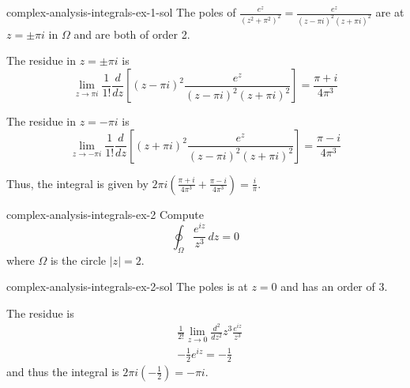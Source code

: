 \documentclass[preview]{standalone}
\begin{document}
\begin{snippetsolution}{complex-analysis-integrals-ex-1-sol}{}
    The poles of \(\frac{e^z}{{(z^2 + \pi^2)}^2} = \frac{e^z}{(z-\pi i)^2(z+\pi i)^2}\)
    are at \(z=\pm \pi i\) in \(\Omega\) and are both of order 2.

    The residue in \(z=\pm \pi i\) is
    \[ \lim_{z \to \pi i} \frac{1}{1!} \frac{d}{dz} \left[
        (z - \pi i)^2 \frac{e^z}{(z-\pi i)^2(z+\pi i)^2}
    \right] = \frac{\pi + i}{4\pi^3}\]

    The residue in \(z=-\pi i\) is
    \[ \lim_{z \to -\pi i} \frac{1}{1!} \frac{d}{dz} \left[
        (z + \pi i)^2 \frac{e^z}{(z-\pi i)^2(z+\pi i)^2}
    \right] = \frac{\pi - i}{4\pi^3}\]

    Thus, the integral is given by \(2\pi i \left( \frac{\pi + i}{4\pi^3} + \frac{\pi - i}{4\pi^3} \right) = \frac{i}{\pi}\).
\end{snippetsolution}

\begin{snippetexercise}{complex-analysis-integrals-ex-2}{} %
    Compute \[ \oint_\Omega \frac{e^{iz}}{z^3} \,dz = 0 \]
    where \(\Omega\) is the circle \(|z|=2\).
\end{snippetexercise}

\begin{snippetsolution}{complex-analysis-integrals-ex-2-sol}{}
    The poles is at \(z=0\) and has an order of 3.

    The residue is
    \begin{align*}
        & \frac{1}{2!} \lim_{z \to 0} \frac{d^2}{dz^2} z^3 \frac{e^{iz}}{z^3} \\
        &-\frac{1}{2} e^{iz} = -\frac{1}{2}
    \end{align*}
    and thus the integral is \(2\pi i (-\frac{1}{2}) = -\pi i\).
\end{snippetsolution}
\end{document}
